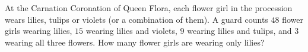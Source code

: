 At the Carnation Coronation of Queen Flora, each flower girl in the procession wears lilies, tulips or violets (or a combination of them). A guard counts $48$ flower girls wearing lilies, $15$ wearing lilies and violets, $9$ wearing lilies and tulips, and $3$ wearing all three flowers. How many flower girls are wearing only lilies?
